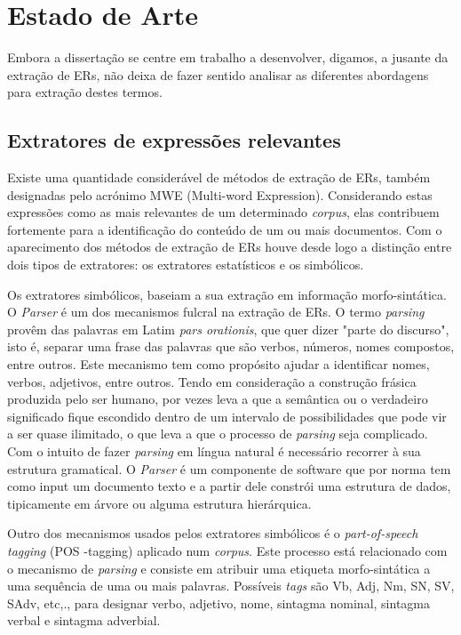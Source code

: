 \chapter{Estado de Arte}
\label{cha:estado_arte}
Embora a dissertação se centre em trabalho a desenvolver, digamos, a jusante da extração de ERs, não deixa de fazer sentido analisar as diferentes abordagens para extração destes termos.
\section{Extratores de expressões relevantes} %
\label{sec:extractores}
Existe uma quantidade considerável de métodos de extração de ERs, também designadas pelo acrónimo MWE (Multi-word Expression). Considerando estas expressões como as mais relevantes de um determinado \textit{corpus}, elas contribuem fortemente para a identificação do conteúdo de um ou mais documentos. Com o aparecimento dos métodos de extração de ERs houve desde logo a distinção entre dois tipos de extratores: os extratores estatísticos e os simbólicos.

Os extratores simbólicos, baseiam a sua extração em informação morfo-sintática. O \textit{Parser} é um dos mecanismos fulcral na extração de ERs. O termo \textit{parsing} provêm das palavras em Latim \textit{pars orationis}, que quer dizer "parte do discurso",  isto é, separar uma frase das palavras que são verbos, números, nomes compostos, entre outros. Este mecanismo tem como propósito ajudar a identificar nomes, verbos, adjetivos, entre outros. Tendo em consideração a construção frásica produzida pelo ser humano, por vezes leva a que a semântica ou o verdadeiro significado fique escondido dentro de um intervalo de possibilidades que pode vir a ser quase ilimitado, o que leva a que o processo de \textit{parsing} seja complicado. Com o intuito de fazer \textit{parsing} em língua natural é necessário recorrer à sua estrutura gramatical.  O \textit{Parser} é um componente de software que por norma tem como input um documento texto e a partir dele constrói uma estrutura de dados, tipicamente em árvore ou alguma estrutura hierárquica.

Outro dos mecanismos usados pelos extratores simbólicos é o \textit{part-of-speech tagging} (POS -tagging) aplicado num \textit{corpus}. Este processo está relacionado com o mecanismo de \textit{parsing} e consiste em atribuir uma etiqueta morfo-sintática a uma sequência de uma ou mais palavras. Possíveis \textit{tags} são Vb, Adj, Nm, SN, SV, SAdv, etc,., para designar verbo, adjetivo, nome, sintagma nominal, sintagma verbal e sintagma adverbial.


